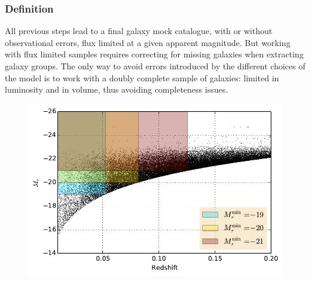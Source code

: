 \subsubsection{Definition}
\label{ssub:galaxy_sample_definition}

All previous steps lead to a final galaxy mock catalogue, with or without
observational errors, flux limited at a given apparent magnitude. But working
with flux limited samples requires correcting for missing galaxies when
extracting galaxy groups. The only way to avoid errors introduced by the
different choices of the model is to work with a doubly complete sample of
galaxies: limited in luminosity and in volume, thus avoiding completeness
issues.
%
\begin{figure}[htb]
    \centering
    \begin{minipage}{0.49\linewidth}
        \includegraphics[width=\linewidth]{figures/mock/subsamples.pdf}
    \end{minipage}
    \begin{minipage}{0.49\linewidth}

\end{minipage}
\end{figure}
